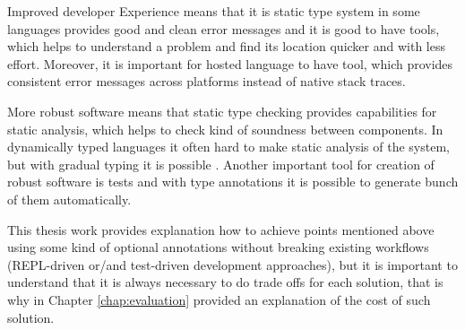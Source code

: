 Improved developer Experience means that it is static type system in some
languages provides good and clean error messages and it is good to have tools,
which helps to understand a problem and find its location quicker and with less
effort. Moreover, it is important for hosted language to have tool, which
provides consistent error messages across platforms instead of native stack
traces.

More robust software means that static type checking provides capabilities for
static analysis, which helps to check kind of soundness between components.
In dynamically typed languages it often hard to make static analysis of the
system, but with gradual typing it is possible \cite{tobin2008design}. Another
important tool for creation of robust software is tests and with type
annotations it is possible to generate bunch of them automatically.

This thesis work provides explanation how to achieve points mentioned above
using some kind of optional annotations without breaking existing workflows
(REPL-driven or/and test-driven development approaches), but it is important to
understand that it is always necessary to do trade offs for each solution, that
is why in Chapter \ref{chap:evaluation} provided an explanation of the cost of
such solution.










